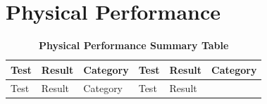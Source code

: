 \documentclass[
]{article}
\begin{document}
\newpage

\section{Physical Performance}\label{physical-performance}

\begin{longtable}[]{@{}
  >{\raggedright\arraybackslash}p{}
  >{\raggedright\arraybackslash}p{}
  >{\raggedright\arraybackslash}p{}
  >{\raggedright\arraybackslash}p{}
  >{\raggedright\arraybackslash}p{}
  >{\raggedright\arraybackslash}p{}@{}}
\caption{\textbf{Physical Performance Summary Table}}\tabularnewline
\toprule\noalign{}
\begin{minipage}[b]{\linewidth}\raggedright
Test
\end{minipage} & \begin{minipage}[b]{\linewidth}\raggedright
Result
\end{minipage} & \begin{minipage}[b]{\linewidth}\raggedright
Category
\end{minipage} & \begin{minipage}[b]{\linewidth}\raggedright
Test
\end{minipage} & \begin{minipage}[b]{\linewidth}\raggedright
Result
\end{minipage} & \begin{minipage}[b]{\linewidth}\raggedright
Category
\end{minipage} \\
\midrule\noalign{}
\endfirsthead
\toprule\noalign{}
\begin{minipage}[b]{\linewidth}\raggedright
Test
\end{minipage} & \begin{minipage}[b]{\linewidth}\raggedright
Result
\end{minipage} & \begin{minipage}[b]{\linewidth}\raggedright
Category
\end{minipage} & \begin{minipage}[b]{\linewidth}\raggedright
Test
\end{minipage} & \begin{minipage}[b]{\linewidth}\raggedright
Result

\end{minipage}
\end{longtable}
\end{document}
